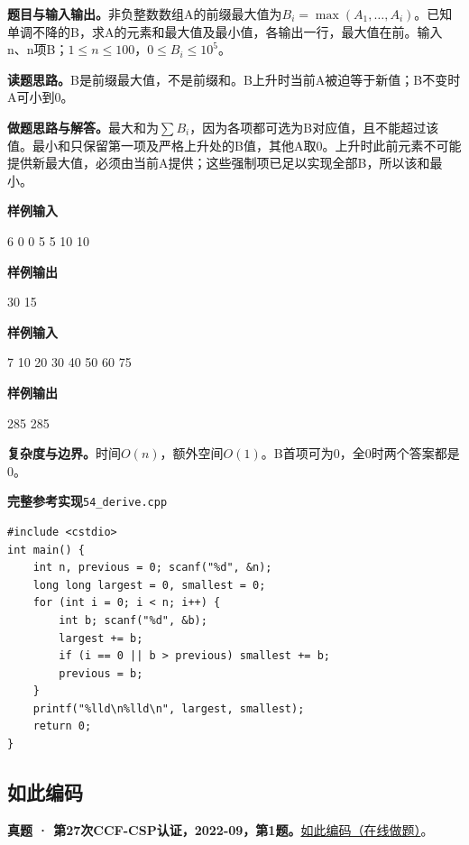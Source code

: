 \documentclass[UTF8,11pt,a4paper,fontset=none]{ctexart}
\begin{document}
\noindent\textbf{题目与输入输出。}非负整数数组A的前缀最大值为$B_i=\max(A_1,\ldots,A_i)$。已知单调不降的B，求A的元素和最大值及最小值，各输出一行，最大值在前。输入n、n项B；$1\le n\le100$，$0\le B_i\le10^5$。

\noindent\textbf{读题思路。}B是前缀最大值，不是前缀和。B上升时当前A被迫等于新值；B不变时A可小到0。

\noindent\textbf{做题思路与解答。}最大和为$\sum B_i$，因为各项都可选为B对应值，且不能超过该值。最小和只保留第一项及严格上升处的B值，其他A取0。上升时此前元素不可能提供新最大值，必须由当前A提供；这些强制项已足以实现全部B，所以该和最小。
\begin{tcolorbox}[samplebox,title={输入输出样例}]
\textbf{样例输入}
\begin{Sample}
6
0 0 5 5 10 10
\end{Sample}
\tcblower
\textbf{样例输出}
\begin{Sample}
30
15
\end{Sample}
\end{tcolorbox}
\begin{tcolorbox}[samplebox,title={输入输出样例}]
\textbf{样例输入}
\begin{Sample}
7
10 20 30 40 50 60 75
\end{Sample}
\tcblower
\textbf{样例输出}
\begin{Sample}
285
285
\end{Sample}
\end{tcolorbox}

\noindent\textbf{复杂度与边界。}时间$O(n)$，额外空间$O(1)$。B首项可为0，全0时两个答案都是0。
\par\noindent\begin{minipage}{\linewidth}
\textbf{完整参考实现}\quad\texttt{54\_derive.cpp}
\begin{lstlisting}
#include <cstdio>
int main() {
    int n, previous = 0; scanf("%d", &n);
    long long largest = 0, smallest = 0;
    for (int i = 0; i < n; i++) {
        int b; scanf("%d", &b);
        largest += b;
        if (i == 0 || b > previous) smallest += b;
        previous = b;
    }
    printf("%lld\n%lld\n", largest, smallest);
    return 0;
}
\end{lstlisting}
\end{minipage}\par

\subsection{如此编码}
\textbf{真题 · 第27次CCF-CSP认证，2022-09，第1题。}\href{https://www.acwing.com/problem/content/4702/}{如此编码（在线做题）}。
\end{document}
